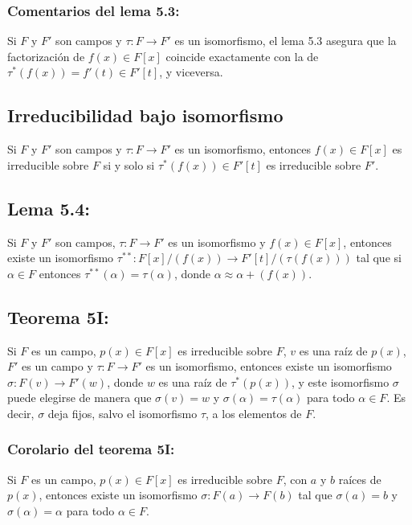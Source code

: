 \documentclass{article}
\begin{document}
\subsubsection*{\color{teal} Comentarios del lema 5.3:}

Si $F$ y $F'$ son campos y $\tau:F\to F'$ es un isomorfismo, el lema 5.3 asegura que la factorización de $f(x)\in F[x]$ coincide exactamente con la de $\tau^*(f(x))=f'(t)\in F'[t]$, y viceversa.

\subsection*{\color{purple} Irreducibilidad bajo isomorfismo}

Si $F$ y $F'$ son campos y $\tau:F\to F'$ es un isomorfismo, entonces $f(x)\in F[x]$ es irreducible sobre $F$ si y solo si $\tau^*(f(x))\in F'[t]$ es irreducible sobre $F'$. 

\subsection*{\color{blue} Lema 5.4:}

Si $F$ y $F'$ son campos, $\tau:F\to F'$ es un isomorfismo y $f(x)\in F[x]$, entonces existe un isomorfismo $\tau^{**}:F[x]/(f(x))\to F'[t]/(\tau(f(x)))$ tal que si $\alpha\in F$ entonces $\tau^{**}(\alpha)=\tau(\alpha)$, donde $\alpha\approx \alpha+(f(x))$.

\subsection*{\color{red} Teorema 5I:}

Si $F$ es un campo, $p(x)\in F[x]$ es irreducible sobre $F$, $v$ es una raíz de $p(x)$, $F'$ es un campo y $\tau:F\to F'$ es un isomorfismo, entonces existe un isomorfismo $\sigma: F(v)\to F'(w)$, donde $w$ es una raíz de $\tau^*(p(x))$, y este isomorfismo $\sigma$ puede elegirse de manera que $\sigma(v)=w$ y $\sigma(\alpha)=\tau(\alpha)$ para todo $\alpha\in F$. Es decir, $\sigma$ deja fijos, salvo el isomorfismo $\tau$, a los elementos de $F$.

\subsubsection*{\color{red} Corolario del teorema 5I:}

Si $F$ es un campo, $p(x)\in F[x]$ es irreducible sobre $F$, con $a$ y $b$ raíces de $p(x)$, entonces existe un isomorfismo $\sigma: F(a)\to F(b)$ tal que $\sigma(a)=b$ y $\sigma(\alpha)=\alpha$ para todo $\alpha\in F$.
\end{document}
